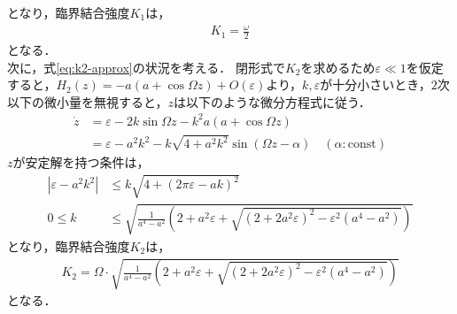 \documentclass[../main]{subfiles}
\begin{document}
    となり，臨界結合強度$K_1$は，
    \begin{align*}
        K_1=\frac{\omega}{2}
    \end{align*}
    となる．\\
    次に，式\eqref{eq:k2-approx}の状況を考える．
    閉形式で$K_2$を求めるため$\varepsilon \ll 1$を仮定すると，$H_2(z)=-a(a+\cos\Omega z)+O(\varepsilon)$より，$k,\varepsilon$が十分小さいとき，$2$次以下の微小量を無視すると，$z$は以下のような微分方程式に従う．
    \begin{align*}
        \dot{z}&=\varepsilon-2k\sin\Omega z-k^2a(a+\cos \Omega z)\\
        &=\varepsilon-a^2k^2-k\sqrt{4+a^2k^2}\sin (\Omega z-\alpha)\quad(\alpha:\mathrm{const})
    \end{align*}
    $z$が安定解を持つ条件は，
    \begin{align*}
        |\varepsilon-a^2k^2|&\leq k\sqrt{4+(2\pi\varepsilon-ak)^2}\\
        0\leq k&\leq \sqrt{\frac{1}{a^4-a^2}\left(2+a^2\varepsilon+\sqrt{(2+2a^2\varepsilon)^2-\varepsilon^2(a^4-a^2)}\right)}
    \end{align*}
    となり，臨界結合強度$K_2$は，
    \begin{align*}
        K_2=\Omega\cdot\sqrt{\frac{1}{a^4-a^2}\left(2+a^2\varepsilon+\sqrt{(2+2a^2\varepsilon)^2-\varepsilon^2(a^4-a^2)}\right)}
    \end{align*}
    となる．    
    
\end{document}
